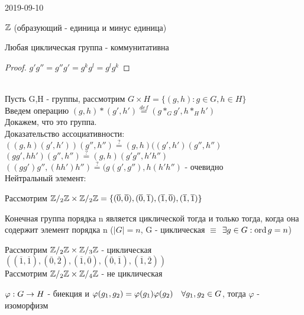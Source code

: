 \documentclass[main]{subfiles}
\begin{document}
\begin{lect} {2019-09-10}
	\begin{definition}
	    $\mathbb{Z}$ (образующий - единица и минус единица)
	\end{definition}

	\begin{remark}
	    Любая циклическая группа - коммунитативна
	\end{remark}

	\begin{proof}
	    $g' g'' = g'' g' = g^k g^l = g^l g^k$
	\end{proof}
	\\
	Пусть G,H - группы, рассмотрим $G \times H = \{(g,h): g\in G, h\in H\}$\\
	Введем операцию $(g,h)*(g',h')\overset{def}{=}(g*_G g', h*_H h')$\\
	Докажем, что это группа.\\
	Доказательство ассоциативности:
	$((g,h)(g',h'))(g'',h'') \overset{?}{=} (g,h)((g',h')(g'',h'')$\\
	$(gg',hh')(g'',h'') \overset{?}{=} (g,h)(g' g'', h' h'')$\\
	$((gg')g'',(hh')h'') \overset{?}{=} (g(g',g''),h(h'h'')$ - очевидно\\
	Нейтральный элемент:

	Рассмотрим $\mathbb{Z} /_2 \mathbb{Z} \times \mathbb{Z} /_2 \mathbb{Z} = \{(\overline{0},\overline{0}),(\overline{0},\overline{1}),(\overline{1},\overline{0}),(\overline{1},\overline{1})\}$

	\begin{definition}
	    Конечная группа порядка n является циклической тогда и только тогда, когда она содержит элемент порядка n ($|G|=n$, G - циклическая $\equiv$ $\exists g \in G: \mathop{\rm ord}\nolimits g = n$)
	\end{definition}
	Рассмотрим $\mathbb{Z} /_2 \mathbb{Z} \times \mathbb{Z} /_3 \mathbb{Z}$ - циклическая\\
	$((\overline{1},\overline{1}), (\overline{0}, \overline{2}), (\overline{1}, \overline{0}), (\overline{0}, \overline{1}), (\overline{1},\overline{2}))$\\
	Рассмотрим $\mathbb{Z} /_2 \mathbb{Z} \times \mathbb{Z} /_4 \mathbb{Z}$ - не циклическая

	\begin{definition}
	    $\varphi: G \rightarrow H$ - биекция и $\varphi(g_1,g_2)=\varphi(g_1) \varphi(g_2)\quad \forall g_1,g_2 \in G$, тогда $\varphi$ - изоморфизм
	\end{definition}


\end{lect}
\end{document}
